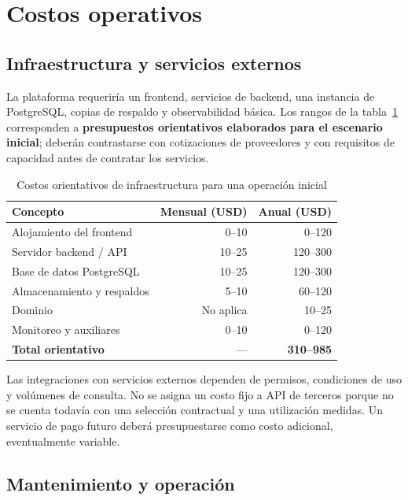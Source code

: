 \section{Costos operativos}\label{sec:ml-operativos}

\subsection{Infraestructura y servicios externos}

La plataforma requeriría un frontend, servicios de backend, una instancia de PostgreSQL, copias de respaldo y observabilidad básica. Los rangos de la tabla~\ref{tab:ml-infraestructura} corresponden a \textbf{presupuestos orientativos elaborados para el escenario inicial}; deberán contrastarse con cotizaciones de proveedores y con requisitos de capacidad antes de contratar los servicios.

\begin{table}[htbp]
\centering
\caption{Costos orientativos de infraestructura para una operación inicial}
\label{tab:ml-infraestructura}
\small
\begin{tabularx}{\textwidth}{@{}X r r@{}}
\toprule
\textbf{Concepto} & \textbf{Mensual (USD)} & \textbf{Anual (USD)} \\
\midrule
Alojamiento del frontend & 0--10 & 0--120 \\
Servidor backend / API & 10--25 & 120--300 \\
Base de datos PostgreSQL & 10--25 & 120--300 \\
Almacenamiento y respaldos & 5--10 & 60--120 \\
Dominio & No aplica & 10--25 \\
Monitoreo y auxiliares & 0--10 & 0--120 \\
\midrule
\textbf{Total orientativo} & --- & \textbf{310--985} \\
\bottomrule
\end{tabularx}
\end{table}

Las integraciones con servicios externos dependen de permisos, condiciones de uso y volúmenes de consulta. No se asigna un costo fijo a API de terceros porque no se cuenta todavía con una selección contractual y una utilización medidas. Un servicio de pago futuro deberá presupuestarse como costo adicional, eventualmente variable.

\subsection{Mantenimiento y operación}

